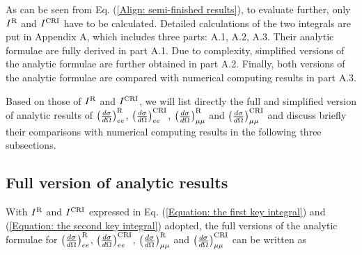 \documentclass[a4paper,10pt,twoside]{cpc-hepnp}
\begin{document}
\begin{CJK*}{UTF8}{gbsn}
\begin{multicols}{2}
	As can be seen from  Eq. (\ref{Align: semi-finished results}), to evaluate further, only $I^{\rm R}$ and $I^{\rm CRI}$ have to be calculated. Detailed calculations of the two integrals are put in Appendix A, which includes three parts: A.1, A.2, A.3. Their analytic formulae are fully derived in part A.1. Due to complexity, simplified versions of the analytic formulae are further obtained in part A.2. Finally, both versions of the analytic formulae are compared with numerical computing results in part A.3.
	
	Based on those of $I^{\rm R}$ and $I^{\rm CRI}$, we will list directly the full and simplified version of analytic results of $\left(\frac{d\sigma}{d\Omega}\right)_{ee}^{\rm R}$, $\left(\frac{d\sigma}{d\Omega}\right)_{ee}^{\rm CRI}$, $\left(\frac{d\sigma}{d\Omega}\right)_{\mu\mu}^{\rm R}$ and $\left(\frac{d\sigma}{d\Omega}\right)_{\mu\mu}^{\rm CRI}$ and discuss briefly their comparisons with numerical computing results in the following three subsections.
	
	\subsection{Full version of analytic results}
	
	With $I^{\rm R}$ and $I^{\rm CRI}$ expressed in Eq. (\ref{Equation: the first key integral}) and (\ref{Equation: the second key integral}) adopted, the full versions of the analytic formulae for $\left(\frac{d\sigma}{d\Omega}\right)_{ee}^{\rm R}$, $\left(\frac{d\sigma}{d\Omega}\right)_{ee}^{\rm CRI}$, $\left(\frac{d\sigma}{d\Omega}\right)_{\mu\mu}^{\rm R}$ and $\left(\frac{d\sigma}{d\Omega}\right)_{\mu\mu}^{\rm CRI}$ can be written as
	
\end{multicols}


\end{CJK*}
\end{document}
